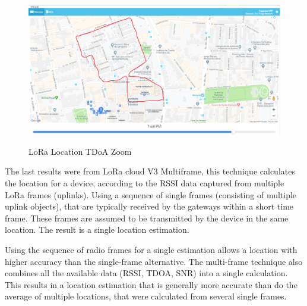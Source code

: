 \begin{figure}[htbp]
  \centering
  
    {\includegraphics[width=0.8\linewidth]{Chapters/Figures/lorageores25-1.PNG}}%
 
  \caption{LoRa Location TDoA Zoom}
  \label{fig:lora_geo_resTDOAZOM}
\end{figure}






The last results were from LoRa cloud V3 Multiframe, this technique calculates the location for a device, according to the RSSI data captured from multiple LoRa frames (uplinks). Using a sequence of single frames (consisting of multiple uplink objects), that are typically received by the gateways within a short time frame. These frames are assumed to be transmitted by the device in the same location. The result is a single location estimation.

Using the sequence of radio frames for a single estimation allows a location with higher accuracy than the single-frame alternative. The multi-frame technique also combines all the available data (RSSI, TDOA, SNR) into a single calculation. This results in a location estimation that is generally more accurate than do the average of multiple locations, that were calculated from several single frames.

